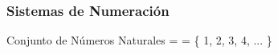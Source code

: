 \begin{frame}
  \frametitle{Sistemas de Numeración}

Conjunto de Números Naturales =   = \{ 1, 2, 3, 4, ... \}

\end{frame}

